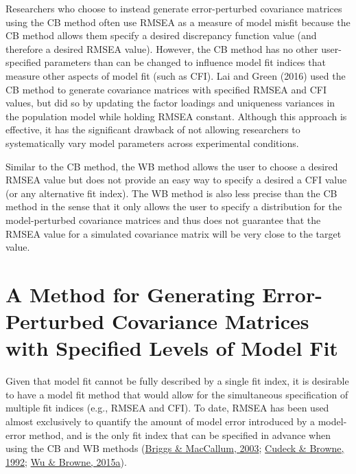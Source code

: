 \documentclass[11pt]{umnthesis}
\begin{document}
Researchers who choose to instead generate error-perturbed covariance matrices using the CB method often use RMSEA as a measure of model misfit because the CB method allows them specify a desired discrepancy function value (and therefore a desired RMSEA value). However, the CB method has no other user-specified parameters than can be changed to influence model fit indices that measure other aspects of model fit (such as CFI). Lai and Green (2016) used the CB method to generate covariance matrices with specified RMSEA and CFI values, but did so by updating the factor loadings and uniqueness variances in the population model while holding RMSEA constant. Although this approach is effective, it has the significant drawback of not allowing researchers to systematically vary model parameters across experimental conditions.

Similar to the CB method, the WB method allows the user to choose a desired RMSEA value but does not provide an easy way to specify a desired a CFI value (or any alternative fit index). The WB method is also less precise than the CB method in the sense that it only allows the user to specify a distribution for the model-perturbed covariance matrices and thus does not guarantee that the RMSEA value for a simulated covariance matrix will be very close to the target value.

\hypertarget{a-method-for-generating-error-perturbed-covariance-matrices-with-specified-levels-of-model-fit}{%
\chapter{A Method for Generating Error-Perturbed Covariance Matrices with Specified Levels of Model Fit}\label{a-method-for-generating-error-perturbed-covariance-matrices-with-specified-levels-of-model-fit}}

Given that model fit cannot be fully described by a single fit index, it is desirable to have a model fit method that would allow for the simultaneous specification of multiple fit indices (e.g., RMSEA and CFI). To date, RMSEA has been used almost exclusively to quantify the amount of model error introduced by a model-error method, and is the only fit index that can be specified in advance when using the CB and WB methods (\protect\hyperlink{ref-briggs2003}{Briggs \& MacCallum, 2003}; \protect\hyperlink{ref-cudeck1992}{Cudeck \& Browne, 1992}; \protect\hyperlink{ref-wu2015}{Wu \& Browne, 2015a}).
\end{document}
